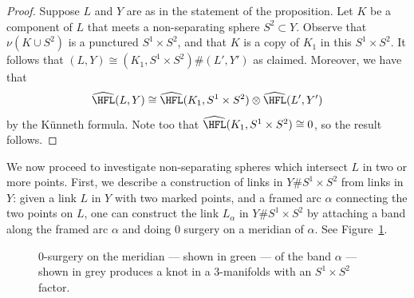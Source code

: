 \documentclass{amsart}
\theoremstyle{definition}
\theoremstyle{remark}
\numberwithin{equation}{section}
\begin{document}
\begin{proof}
Suppose $L$ and $Y$ are as in the statement of the proposition. Let $K$ be a component of $L$ that meets a non-separating sphere $S^2\subset Y$. Observe that $\nu(K\cup S^2)$ is a punctured $S^1\times S^2$, and that $K$ is a copy of $K_1$ in this $S^1\times S^2$. It follows that $(L,Y)\cong (K_1,S^1\times S^2)\#(L',Y')$ as claimed. Moreover, we have that  $$\widehat{\HFL}(L,Y)\cong\widehat{\HFL}(K_1,S^1\times S^2)\otimes\widehat{\HFL}(L',Y')$$ by the K\"unneth formula. Note too that $\widehat{\HFL}(K_1,S^1\times S^2)\cong 0$, so the result follows.
\end{proof}



We now proceed to investigate non-separating spheres which intersect $L$ in two or more points.  First, we describe a construction of links in $Y\#S^1\times S^2$ from links in $Y$: given a link $L$ in $Y$ with two marked points, and a framed arc $\alpha$ connecting the two points on $L$, one can construct the link $L_{\alpha}$ in $Y\#S^1\times S^2$ by attaching a band along the framed arc $\alpha$ and doing $0$ surgery on a meridian of $\alpha$. See Figure~\ref{fig:bandsurgery}.

\begin{figure}
   \begin{center}
\end{center}
\caption{$0$-surgery on the meridian --- shown in green --- of the band $\alpha$ --- shown in grey produces a knot in a $3$-manifolds with an $S^1\times S^2$ factor.}\label{fig:bandsurgery}
\end{figure}
\end{document}
